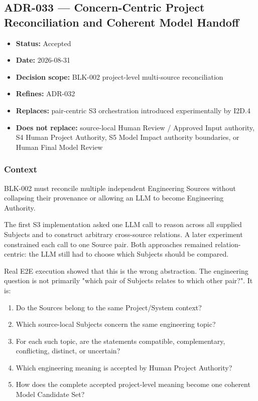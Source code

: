 \hypertarget{adr-033--concern-centric-project-reconciliation-and-coherent-model-handoff}{%
\subsection{ADR-033 --- Concern-Centric Project Reconciliation and Coherent Model Handoff}\label{adr-033--concern-centric-project-reconciliation-and-coherent-model-handoff}}

\begin{itemize}
\tightlist
\item
  \textbf{Status:} Accepted
\item
  \textbf{Date:} 2026-08-31
\item
  \textbf{Decision scope:} BLK-002 project-level multi-source reconciliation
\item
  \textbf{Refines:} ADR-032
\item
  \textbf{Replaces:} pair-centric S3 orchestration introduced experimentally by I2D.4
\item
  \textbf{Does not replace:} source-local Human Review / Approved Input authority, S4 Human Project Authority, S5 Model Impact authority boundaries, or Human Final Model Review
\end{itemize}

\hypertarget{context-19}{%
\subsubsection{Context}\label{context-19}}

BLK-002 must reconcile multiple independent Engineering Sources without collapsing their provenance or allowing an LLM to become Engineering Authority.

The first S3 implementation asked one LLM call to reason across all supplied Subjects and to construct arbitrary cross-source relations. A later experiment constrained each call to one Source pair. Both approaches remained relation-centric: the LLM still had to choose which Subjects should be compared.

Real E2E execution showed that this is the wrong abstraction. The engineering question is not primarily "which pair of Subjects relates to which other pair?". It is:

\begin{enumerate}
\def\labelenumi{\arabic{enumi}.}
\tightlist
\item
  Do the Sources belong to the same Project/System context?
\item
  Which source-local Subjects concern the same engineering topic?
\item
  For each such topic, are the statements compatible, complementary, conflicting, distinct, or uncertain?
\item
  Which engineering meaning is accepted by Human Project Authority?
\item
  How does the complete accepted project-level meaning become one coherent Model Candidate Set?
\end{enumerate}

